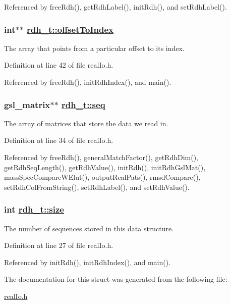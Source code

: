 Referenced by free\-Rdh(), get\-Rdh\-Label(), init\-Rdh(), and set\-Rdh\-Label().\hypertarget{structrdh__t_o6}{
\subsubsection[offsetToIndex]{\setlength{\rightskip}{0pt plus 5cm}int$\ast$$\ast$ \hyperlink{structrdh__t_o6}{rdh\_\-t::offset\-To\-Index}}}
\label{structrdh__t_o6}


The array that points from a particular offset to its index. 

Definition at line 42 of file real\-Io.h.

Referenced by free\-Rdh(), init\-Rdh\-Index(), and main().\hypertarget{structrdh__t_o3}{
\subsubsection[seq]{\setlength{\rightskip}{0pt plus 5cm}gsl\_\-matrix$\ast$$\ast$ \hyperlink{structrdh__t_o3}{rdh\_\-t::seq}}}
\label{structrdh__t_o3}


The array of matrices that store the data we read in. 

Definition at line 34 of file real\-Io.h.

Referenced by free\-Rdh(), general\-Match\-Factor(), get\-Rdh\-Dim(), get\-Rdh\-Seq\-Length(), get\-Rdh\-Value(), init\-Rdh(), init\-Rdh\-Gsl\-Mat(), mass\-Spec\-Compare\-WElut(), output\-Real\-Pats(), rmsd\-Compare(), set\-Rdh\-Col\-From\-String(), set\-Rdh\-Label(), and set\-Rdh\-Value().\hypertarget{structrdh__t_o0}{
\subsubsection[size]{\setlength{\rightskip}{0pt plus 5cm}int \hyperlink{structrdh__t_o0}{rdh\_\-t::size}}}
\label{structrdh__t_o0}


The number of sequences stored in this data structure. 

Definition at line 27 of file real\-Io.h.

Referenced by init\-Rdh(), init\-Rdh\-Index(), and main().

The documentation for this struct was generated from the following file:\begin{CompactItemize}
\item 
\hyperlink{realIo_8h}{real\-Io.h}\end{CompactItemize}
